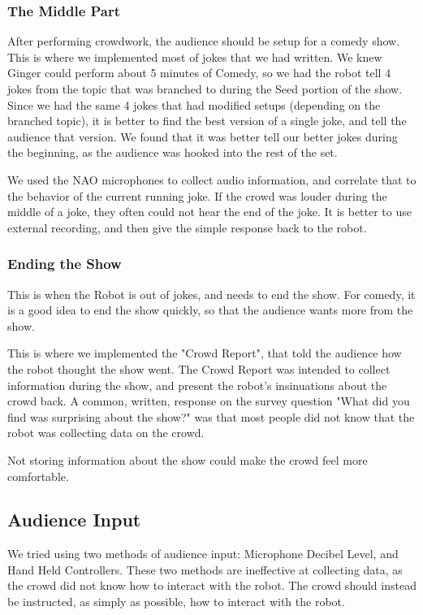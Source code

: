     \subsubsection{The Middle Part}

    After performing crowdwork, the audience should be setup for a comedy show. This is where we implemented most of jokes that we had written.
    We knew Ginger could perform about 5 minutes of Comedy, so we had the robot tell 4 jokes from the topic that was branched to during the Seed portion of the show.
    Since we had the same 4 jokes that had modified setups (depending on the branched topic), it is better to find the best version of a single joke, and tell the audience that version. We found that it was better tell our better jokes during the beginning, as the audience was hooked into the rest of the set.

    We used the NAO microphones to collect audio information, and correlate that to the behavior of the current running joke.
    If the crowd was louder during the middle of a joke, they often could not hear the end of the joke.
    It is better to use external recording, and then give the simple response back to the robot.

    \subsubsection{Ending the Show}

    This is when the Robot is out of jokes, and needs to end the show.
    For comedy, it is a good idea to end the show quickly, so that the audience wants more from the show.

    This is where we implemented the "Crowd Report", that told the audience how the robot thought the show went.
    The Crowd Report was intended to collect information during the show, and present the robot's insinuations about the crowd back.
    A common, written, response on the survey question "What did you find was surprising about the show?" was that most people did not know that the robot was collecting data on the crowd.

    Not storing information about the show could make the crowd feel more comfortable.


\subsection{Audience Input}
    We tried using two methods of audience input: Microphone Decibel Level, and Hand Held Controllers.
    These two methods are ineffective at collecting data, as the crowd did not know how to interact with the robot.
    The crowd should instead be instructed, as simply as possible, how to interact with the robot.


